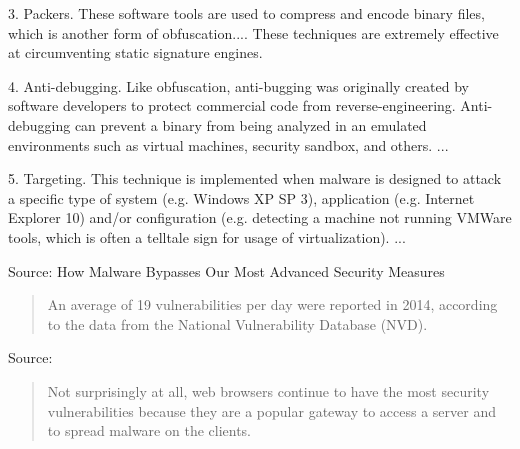 \documentclass[20pt,landscape,a4paper,footrule]{foils}
\begin{document}

\begin{list1}
\item 3. Packers. These software tools are used to compress and encode binary files, which is another form of obfuscation.... These techniques are extremely effective at circumventing static signature engines.
\item 4. Anti-debugging. Like obfuscation, anti-bugging was originally created by software developers to protect commercial code from reverse-engineering. Anti-debugging can prevent a binary from being analyzed in an emulated environments such as virtual machines, security sandbox, and others. ...
\item 5.  Targeting. This technique is implemented when malware is designed to attack a specific type of system (e.g. Windows XP SP 3), application (e.g. Internet Explorer 10) and/or configuration (e.g. detecting a machine not running VMWare tools, which is often a telltale sign for usage of virtualization). ...
\end{list1}

Source: How Malware Bypasses Our Most Advanced Security Measures\\
{\tiny{}}





\begin{quote}
An average of 19 vulnerabilities per day were reported in 2014, according to the data from the National Vulnerability Database (NVD).
\end{quote}

Source:\\
{\footnotesize
{}}




\begin{quote}\small
Not surprisingly at all, web browsers continue to have the most security vulnerabilities because they are a popular gateway to access a server and to spread malware on the clients.
\end{quote}
\end{document}
